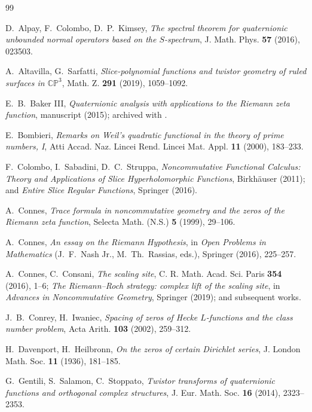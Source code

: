 \documentclass[11pt]{amsart}
\theoremstyle{definition}
\theoremstyle{remark}
\begin{document}
\begin{thebibliography}{99}
\itemsep3pt

 D.~Alpay, F.~Colombo, D.~P.~Kimsey, \emph{The spectral theorem for quaternionic unbounded normal operators based on the $S$-spectrum}, J. Math. Phys. \textbf{57} (2016), 023503.

 A.~Altavilla, G.~Sarfatti, \emph{Slice-polynomial functions and twistor geometry of ruled surfaces in $\mathbb{CP}^3$}, Math. Z. \textbf{291} (2019), 1059--1092.

 E.~B.~Baker III, \emph{Quaternionic analysis with applications to the Riemann zeta function}, manuscript (2015); archived with \cite{ZS}.

 E.~Bombieri, \emph{Remarks on Weil's quadratic functional in the theory of prime numbers, I}, Atti Accad. Naz. Lincei Rend. Lincei Mat. Appl. \textbf{11} (2000), 183--233.

 F.~Colombo, I.~Sabadini, D.~C.~Struppa, \emph{Noncommutative Functional Calculus: Theory and Applications of Slice Hyperholomorphic Functions}, Birkh\"auser (2011); and \emph{Entire Slice Regular Functions}, Springer (2016).

 A.~Connes, \emph{Trace formula in noncommutative geometry and the zeros of the Riemann zeta function}, Selecta Math. (N.S.) \textbf{5} (1999), 29--106.

 A.~Connes, \emph{An essay on the Riemann Hypothesis}, in \emph{Open Problems in Mathematics} (J.~F.~Nash Jr., M.~Th.~Rassias, eds.), Springer (2016), 225--257.

 A.~Connes, C.~Consani, \emph{The scaling site}, C. R. Math. Acad. Sci. Paris \textbf{354} (2016), 1--6; \emph{The Riemann--Roch strategy: complex lift of the scaling site}, in \emph{Advances in Noncommutative Geometry}, Springer (2019); and subsequent works.

 J.~B.~Conrey, H.~Iwaniec, \emph{Spacing of zeros of Hecke $L$-functions and the class number problem}, Acta Arith. \textbf{103} (2002), 259--312.

 H.~Davenport, H.~Heilbronn, \emph{On the zeros of certain Dirichlet series}, J. London Math. Soc. \textbf{11} (1936), 181--185.

 G.~Gentili, S.~Salamon, C.~Stoppato, \emph{Twistor transforms of quaternionic functions and orthogonal complex structures}, J. Eur. Math. Soc. \textbf{16} (2014), 2323--2353.


\end{thebibliography}
\end{document}
